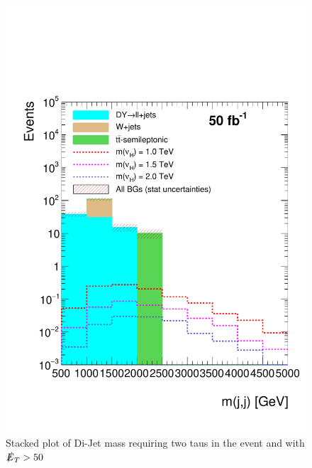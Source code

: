 \begin{figure}[H]
\centering
\includegraphics[width=\linewidth]{StackPlots/mjj_2taus_met50_50ifb.pdf}
\caption{Stacked plot of Di-Jet mass requiring two taus in the event and with $\slashed{E}_{T} > 50$}
\label{fig: mjj2tausMet50}
\end{figure}

